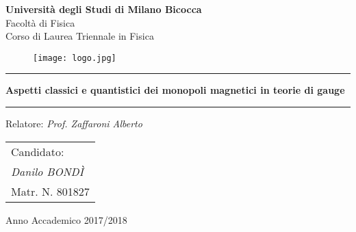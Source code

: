 \begin{titlepage}

\begin{center}
   \huge \textbf{ Università degli Studi di Milano Bicocca}\\ [0.5ex]
   \LARGE Facoltà di Fisica \\ [0.5ex]
    Corso di Laurea Triennale in Fisica \\ [0.5ex]
\end{center}


\vspace{0.4cm}

\begin{figure}[h]
\centering
\texttt{[image: logo.jpg]}
\end{figure}


\vspace{1cm}

 \hrule
\vspace{0.5cm}

\begin{center}\huge\textbf{
   Aspetti classici e quantistici dei monopoli magnetici in teorie di gauge}
\end{center}

\vspace{0.5cm}
 \hrule

\vspace{2cm}
\Large
Relatore: \emph{Prof. Zaffaroni Alberto} \\

\vspace{0.cm}

\begin{table}[h]
\hskip 12cm
\begin{tabular}{l}
    	\Large Candidato: \\ [0.5ex]
    	\Large \emph{Danilo BONDÌ} \\ [0.5ex]
    	\Large Matr. N. 801827 \\
\end{tabular}
\end{table}


\vspace{1cm}

\large
\vfill
\begin{center}
   Anno Accademico 2017/2018
\end{center}

\end{titlepage}
